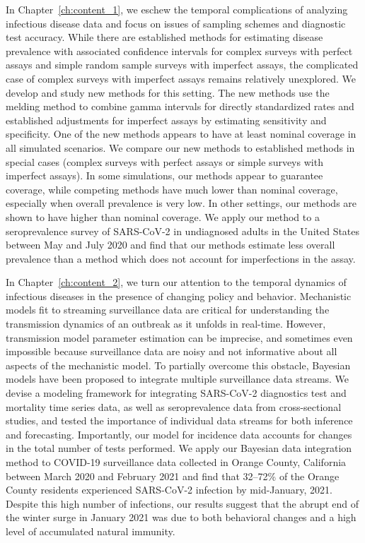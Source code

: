 In Chapter~\ref{ch:content_1}, we eschew the temporal complications of analyzing infectious disease data and focus on issues of sampling schemes and diagnostic test accuracy.
While there are established methods for estimating disease prevalence with associated confidence intervals for complex surveys with perfect assays and simple random sample surveys with imperfect assays, the complicated case of complex surveys with imperfect assays remains relatively unexplored.
We develop and study new methods for this setting.
The new methods use the melding method to combine gamma intervals for directly standardized rates and established adjustments for imperfect assays by estimating sensitivity and specificity.
One of the new methods appears to have at least nominal coverage in all simulated scenarios.
We compare our new methods to established methods in special cases (complex surveys with perfect
assays or simple surveys with imperfect assays).
In some simulations, our methods appear to guarantee coverage, while competing methods have much lower than nominal coverage, especially when overall prevalence is very low.
In other settings, our methods are shown to have higher than nominal coverage.
We apply our method to a seroprevalence survey of SARS-CoV-2 in undiagnosed adults in the United States between May and July 2020 and find that our methods estimate less overall prevalence than a method which does not account for imperfections in the assay.

In Chapter~\ref{ch:content_2}, we turn our attention to the temporal dynamics of infectious diseases in the presence of changing policy and behavior.
Mechanistic models fit to streaming surveillance data are critical for understanding the transmission dynamics of an outbreak as it unfolds in real-time.
However, transmission model parameter estimation can be imprecise, and sometimes even impossible because surveillance data are noisy and not informative about all aspects of the mechanistic model.
To partially overcome this obstacle, Bayesian models have been proposed to integrate multiple surveillance data streams. 
We devise a modeling framework for integrating SARS-CoV-2 diagnostics test and mortality time series data, as well as seroprevalence data from cross-sectional studies, and tested the importance of individual data streams for both inference and forecasting.
Importantly, our model for incidence data accounts for changes in the total number of tests performed.
We apply our Bayesian data integration method to COVID-19 surveillance data collected in Orange County, California between March 2020 and February 2021 and find that 32--72\% of the Orange County residents experienced SARS-CoV-2 infection by mid-January, 2021.
Despite this high number of infections, our results suggest that the abrupt end of the winter surge in January 2021 was due to both behavioral changes and a high level of accumulated natural immunity.

